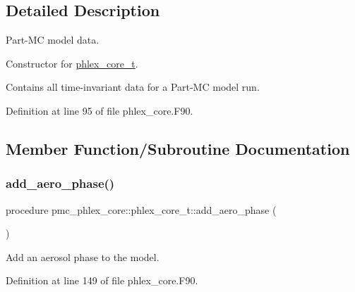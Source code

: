 \subsection{Detailed Description}
Part-\/\+MC model data. 

Constructor for \mbox{\hyperlink{structpmc__phlex__core_1_1phlex__core__t}{phlex\+\_\+core\+\_\+t}}.

Contains all time-\/invariant data for a Part-\/\+MC model run. 

Definition at line 95 of file phlex\+\_\+core.\+F90.



\subsection{Member Function/\+Subroutine Documentation}
\mbox{\label{structpmc__phlex__core_1_1phlex__core__t_a374eb0fbb2bbb91e52deab0130873876}} 
\subsubsection{\texorpdfstring{add\+\_\+aero\+\_\+phase()}{add\_aero\_phase()}}
{\footnotesize\ttfamily procedure pmc\+\_\+phlex\+\_\+core\+::phlex\+\_\+core\+\_\+t\+::add\+\_\+aero\+\_\+phase (\begin{DoxyParamCaption}{ }\end{DoxyParamCaption})\hspace{0.3cm}{\ttfamily [private]}}



Add an aerosol phase to the model. 



Definition at line 149 of file phlex\+\_\+core.\+F90.

\mbox{\label{structpmc__phlex__core_1_1phlex__core__t_af9ceb8ffe7584d7871afb3511ad60b69}} 

